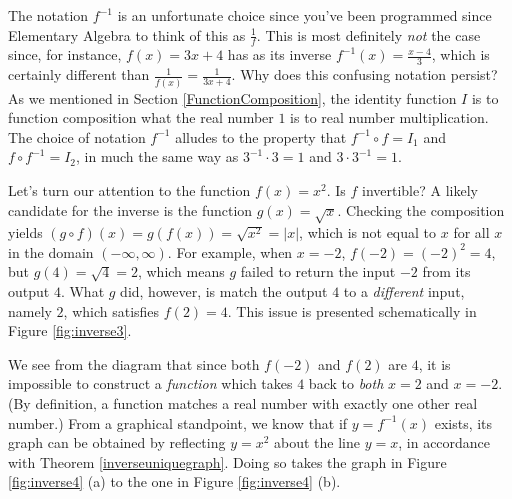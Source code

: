 \smallskip

The notation $f^{-1}$ is an unfortunate choice since you've been programmed since Elementary Algebra to think of this as $\frac{1}{f}$.  This is most definitely \textit{not} the case since, for instance, $f(x) = 3x+4$ has as its inverse $f^{-1}(x) = \frac{x-4}{3}$, which is certainly different than $\frac{1}{f(x)} = \frac{1}{3x+4}$.  Why does this confusing notation persist?  As we mentioned in Section \ref{FunctionComposition}, the identity function $I$ is to function composition what the real number $1$ is to real number multiplication.  The choice of notation $f^{-1}$ alludes to the property that $f^{-1} \circ f = I_{1}$ and $f \circ f^{-1} = I_{2}$, in much the same way as $3^{-1} \cdot 3 = 1$ and $3 \cdot 3^{-1} = 1$.  

\smallskip

Let's turn our attention to the function $f(x) = x^2$.  Is $f$ invertible?  A likely candidate for the inverse is the function $g(x) = \sqrt{x}$.  Checking the composition yields $(g\circ f)(x) = g(f(x)) = \sqrt{x^2} = |x|$, which is not equal to $x$ for all $x$ in the domain $(-\infty, \infty)$.  For example, when $x=-2$,  $f(-2)= (-2)^2 = 4$, but $g(4) = \sqrt{4}=2$, which means $g$ failed to return the input $-2$ from its output $4$.  What $g$ did, however, is match the output $4$ to a \textit{different} input, namely $2$, which satisfies $f(2) = 4$.  This issue is presented schematically in Figure \ref{fig:inverse3}.




We see from the diagram that since both $f(-2)$ and $f(2)$ are $4$, it is impossible to construct a \textit{function} which takes $4$ back to \textit{both} $x=2$ and $x=-2$. (By definition, a function matches a real number with exactly one other real number.)  From a graphical standpoint, we know that if $y=f^{-1}(x)$ exists, its graph can be obtained by reflecting $y=x^2$ about the line $y=x$, in accordance with Theorem \ref{inverseuniquegraph}.  Doing so takes the graph in Figure \ref{fig:inverse4} (a) to the one in Figure \ref{fig:inverse4} (b).


